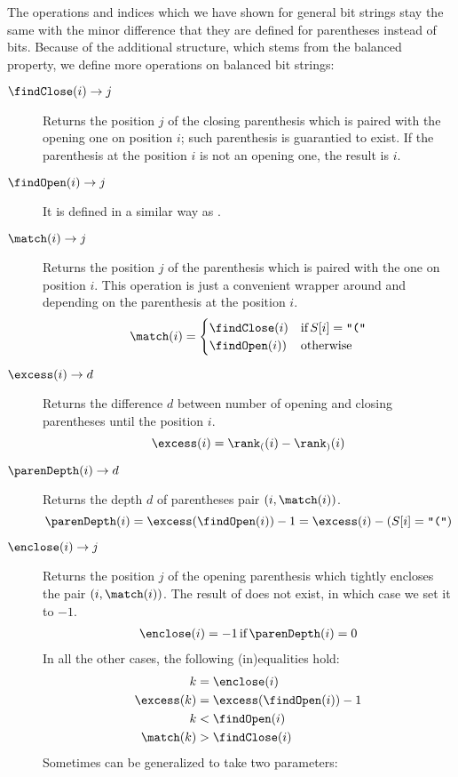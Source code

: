 The operations and indices which we have shown for general bit strings stay the same with the minor difference that they are defined for parentheses instead of bits.
Because of the additional structure, which stems from the balanced property, we define more operations on balanced bit strings:
\begin{description}
	\item[$\findClose(i) \rightarrow j$]
	Returns the position $j$ of the closing parenthesis which is paired with the opening one on position $i$; such parenthesis is guarantied to exist.
	If the parenthesis at the position $i$ is not an opening one, the result is $i$.
	
	\item[$\findOpen(i) \rightarrow j$]
	It is defined in a similar way as \findClose.
	
	\item[$\match(i) \rightarrow j$]
	Returns the position $j$ of the parenthesis which is paired with the one on position $i$.
	This operation is just a convenient wrapper around \findOpen{} and \findClose{} depending on the parenthesis at the position $i$.
	$$ \match(i) = 
	\begin{cases}
		\findClose(i) & \textif S[i] = \openingParen \\
		\findOpen(i)) & \textotherwise
	\end{cases}$$
	
	\item[$\excess(i) \rightarrow d$]
	Returns the difference $d$ between number of opening and closing parentheses until the position $i$.
	$$ \excess(i) = \rank_((i) - \rank_)(i)$$
	
	\item[$\parenDepth(i) \rightarrow d$]
	Returns the depth $d$ of parentheses pair $(i, \match(i))$.
	$$ \parenDepth(i) = \excess(\findOpen(i)) - 1 = \excess(i) - (S[i] = \openingParen) $$
	
	\item[$\enclose(i) \rightarrow j$]
	Returns the position $j$ of the opening parenthesis which tightly encloses the pair $(i, \match(i))$.
	The result of \enclose{} does not exist, in which case we set it to $-1$.
	\begin{align*}
		\enclose(i) = -1 \textif \parenDepth(i) = 0
	\end{align*}
	In all the other cases, the following (in)equalities hold:
	\begin{align*}
		k &= \enclose(i) \\
		\excess(k) &= \excess(\findOpen(i)) - 1 \\
		k &< \findOpen(i) \\
		\match(k) &> \findClose(i)
	\end{align*}
	Sometimes \enclose{} can be generalized to take two parameters:
	

\end{description}
